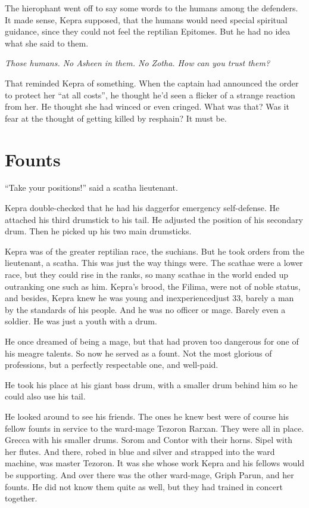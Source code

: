 \documentclass
  [a4paper,
   12pt,
   oneside
  ]%
  {article}
\begin{document}
The hierophant went off to say some words to the humans among the defenders. 
It made sense, Kepra supposed, that the humans would need special spiritual guidance, since they could not feel the reptilian Epitomes. But he had no idea what she said to them.

\emph{Those humans. No Asheen in them. No Zotha. How can you trust them?}

That reminded Kepra of something. 
When the captain had announced the order to protect her ``at all costs'', he thought he'd seen a flicker of a strange reaction from her. 
He thought she had winced or even cringed. 
What was that? 
Was it fear at the thought of getting killed by resphain? 
It must be.



\section{Founts}
``Take your positions!'' said a scatha lieutenant. 

Kepra double-checked that he had his dagger\dash{}for emergency self-defense. 
He attached his third drumstick to his tail. 
He adjusted the position of his secondary drum. 
Then he picked up his two main drumsticks.

Kepra was of the greater reptilian race, the suchians. 
But he took orders from the lieutenant, a scatha. 
This was just the way things were. 
The scathae were a lower race, but they could rise in the ranks, so many scathae in the world ended up outranking one such as him.
Kepra’s brood, the Filima, were not of noble status, and besides, Kepra knew he was young and inexperienced\dash{}just 33, barely a man by the standards of his people. 
And he was no officer or mage. 
Barely even a soldier. 
He was just a youth with a drum. 

He once dreamed of being a mage, but that had proven too dangerous for one of his meagre talents. 
So now he served as a fount. Not the most glorious of professions, but a perfectly respectable one, and well-paid.

He took his place at his giant bass drum, with a smaller drum behind him so he could also use his tail. 

He looked around to see his friends. 
The ones he knew best were of course his fellow founts in service to the ward-mage Tezoron Rarxan. 
They were all in place. Grecca with his smaller drums. Sorom and Contor with their horns. Sipel with her flutes. 
And there, robed in blue and silver and strapped into the ward machine, was master Tezoron. 
It was she whose work Kepra and his fellows would be supporting. And over there was the other ward-mage, Griph Parun, and her founts. He did not know them quite as well, but they had trained in concert together. 
\end{document}
